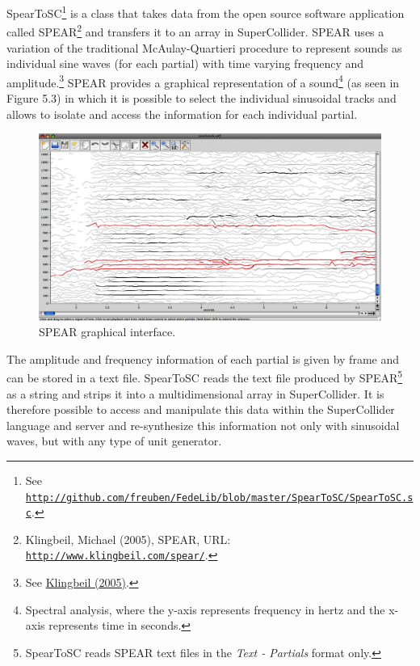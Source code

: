 SpearToSC\footnote{See \href{http://github.com/freuben/FedeLib/blob/master/SpearToSC/SpearToSC.sc}{\texttt{http://github.com/freuben/FedeLib/blob/master/SpearToSC/SpearToSC.sc}}.} is a class that takes data from the open source software application called SPEAR\footnote{Klingbeil, Michael (2005), SPEAR, URL: \href{http://www.klingbeil.com/spear/}{\texttt{http://www.klingbeil.com/spear/}}.} and transfers it to an array in SuperCollider. SPEAR uses a variation of the traditional McAulay-Quartieri procedure to represent sounds as individual sine waves (for each partial) with time varying frequency and amplitude.\footnote{See \hyperlink{klingbeil}{Klingbeil (2005)}.} SPEAR provides a graphical representation of a sound\footnote{Spectral analysis, where the y-axis represents frequency in hertz and the x-axis represents time in seconds.} (as seen in Figure 5.3) in which it is possible to select the individual sinusoidal tracks and allows to isolate and access the information for each individual partial. 
\begin{figure}[htbp] %
   \centering
   \includegraphics[width=15cm]{chapter5/Spear1.tif} %
   \caption{SPEAR graphical interface.}
   \label{fig:example}
\end{figure}
The amplitude and frequency information of each partial is given by frame and can be stored in a text file. SpearToSC reads the text file produced by SPEAR\footnote{SpearToSC reads SPEAR text files in the \emph{Text - Partials} format only.} as a string and strips it into a multidimensional array in SuperCollider. It is therefore possible to access and manipulate this data within the SuperCollider language and server and re-synthesize this information not only with sinusoidal waves, but with any type of unit generator. 

